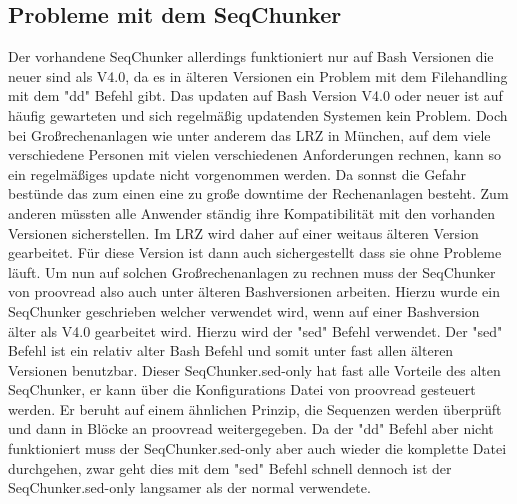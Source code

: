 \documentclass{scrartcl}
\begin{document}
\subsection{Probleme mit dem SeqChunker}
\label{sec-5-2}
Der vorhandene SeqChunker allerdings funktioniert nur auf Bash Versionen die neuer sind als V4.0, da es in älteren Versionen
ein Problem mit dem Filehandling mit dem "dd" Befehl gibt. Das updaten auf Bash Version V4.0 oder neuer ist auf 
häufig gewarteten und sich regelmäßig updatenden Systemen kein Problem. Doch bei Großrechenanlagen wie unter anderem
das LRZ in München, auf dem viele verschiedene Personen mit vielen verschiedenen Anforderungen rechnen, kann so ein 
regelmäßiges update nicht vorgenommen werden. Da sonnst die Gefahr bestünde das zum einen eine zu große downtime der Rechenanlagen besteht.
Zum anderen müssten alle Anwender ständig ihre Kompatibilität mit den vorhanden Versionen sicherstellen. Im LRZ wird daher auf einer weitaus 
älteren Version gearbeitet. Für diese Version ist dann auch sichergestellt dass sie ohne Probleme läuft.
Um nun auf solchen Großrechenanlagen zu rechnen muss der SeqChunker von proovread also auch unter älteren Bashversionen 
arbeiten. Hierzu wurde ein SeqChunker geschrieben welcher verwendet wird, wenn auf einer Bashversion älter als V4.0 
gearbeitet wird. Hierzu wird der "sed" Befehl verwendet. Der "sed" Befehl ist ein relativ alter Bash Befehl und somit 
unter fast allen älteren Versionen benutzbar. Dieser SeqChunker.sed-only hat fast alle Vorteile des alten SeqChunker, er kann
über die Konfigurations Datei von proovread gesteuert werden. Er beruht auf einem ähnlichen Prinzip, die Sequenzen 
werden überprüft und dann in Blöcke an proovread weitergegeben. Da der "dd" Befehl aber nicht funktioniert muss der SeqChunker.sed-only
aber auch wieder die komplette Datei durchgehen, zwar geht dies mit dem "sed" Befehl schnell dennoch ist der SeqChunker.sed-only
langsamer als der normal verwendete. 
\end{document}
